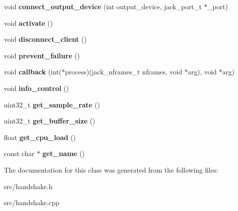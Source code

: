 \begin{DoxyCompactItemize}
void {\bfseries connect\+\_\+output\+\_\+device} (int output\+\_\+device, jack\+\_\+port\+\_\+t $\ast$\+\_\+port)
\item 
\mbox{\label{classhandshake_a79dd7ace8ea6d51a2d6dcce12c54cdc3}} 
void {\bfseries activate} ()
\item 
\mbox{\label{classhandshake_a744a673f21fc3dad9697b9ff1b8f0be4}} 
void {\bfseries disconnect\+\_\+client} ()
\item 
\mbox{\label{classhandshake_af853a97e0d275020538364f2df288a34}} 
void {\bfseries prevent\+\_\+failure} ()
\item 
\mbox{\label{classhandshake_ad2bbd7255f00eeca40d1f4246ce06518}} 
void {\bfseries callback} (int($\ast$process)(jack\+\_\+nframes\+\_\+t nframes, void $\ast$arg), void $\ast$arg)
\item 
\mbox{\label{classhandshake_a78657fe9c7c4f8e944554aac9330d8cf}} 
void {\bfseries info\+\_\+control} ()
\item 
\mbox{\label{classhandshake_a22df15ebd88c3b81e0147e1125613ff1}} 
uint32\+\_\+t {\bfseries get\+\_\+sample\+\_\+rate} ()
\item 
\mbox{\label{classhandshake_ada0e5d1fd5e8e3e7a6376dc68f205338}} 
uint32\+\_\+t {\bfseries get\+\_\+buffer\+\_\+size} ()
\item 
\mbox{\label{classhandshake_af9a8b934e5c4724f62b70abb2949231c}} 
float {\bfseries get\+\_\+cpu\+\_\+load} ()
\item 
\mbox{\label{classhandshake_af408dd2b28c2ff088d0aafbd08f24506}} 
const char $\ast$ {\bfseries get\+\_\+name} ()
\end{DoxyCompactItemize}


The documentation for this class was generated from the following files\+:\begin{DoxyCompactItemize}
\item 
src/handshake.\+h\item 
src/handshake.\+cpp\end{DoxyCompactItemize}
